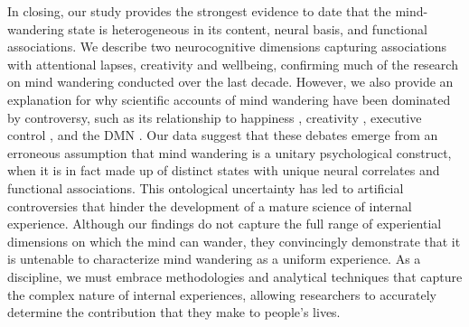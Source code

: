 In closing, our study provides the strongest evidence to date that the mind-wandering state is heterogeneous in its content, neural basis, and functional associations. We describe two neurocognitive dimensions capturing associations with attentional lapses, creativity and wellbeing, confirming much of the research on mind wandering conducted over the last decade. However, we also provide an explanation for why scientific accounts of mind wandering have been dominated by controversy, such as its relationship to 
happiness \cite{Killingsworth2010}, 
creativity \cite{Smeekens2016}, 
executive control \cite{McVay2009}, 
and the DMN \cite{Gilbert2007}. 
Our data suggest that these debates emerge from an erroneous assumption that mind wandering is a unitary psychological construct, when it is in fact made up of distinct states with unique neural correlates and functional associations. This ontological uncertainty has led to artificial controversies that hinder the development of a mature science of internal experience. Although our findings do not capture the full range of experiential dimensions on which the mind can wander, they convincingly demonstrate that it is untenable to characterize mind wandering as a uniform experience. As a discipline, we must embrace methodologies and analytical techniques that capture the complex nature of internal experiences, allowing researchers to accurately determine the contribution that they make to people’s lives.

